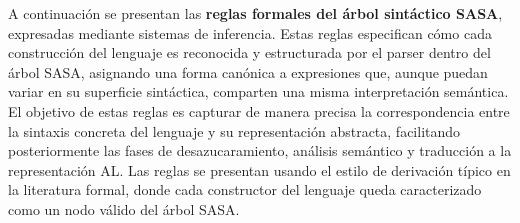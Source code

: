 \documentclass[a4paper,12pt]{article}
\begin{document}
\begin{tcolorbox}[title= Correción: Reglas de Inferencia SASA, breakable]
A continuación se presentan las \textbf{reglas formales del árbol sintáctico SASA}, expresadas mediante sistemas de inferencia. Estas reglas especifican cómo cada construcción del lenguaje es reconocida y estructurada por el parser dentro del árbol SASA, asignando una forma canónica a expresiones que, aunque puedan variar en su superficie sintáctica, comparten una misma interpretación semántica. El objetivo de estas reglas es capturar de manera precisa la correspondencia entre la sintaxis concreta del lenguaje y su representación abstracta, facilitando posteriormente las fases de desazucaramiento, análisis semántico y traducción a la representación AL. Las reglas se presentan usando el estilo de derivación típico en la literatura formal, donde cada constructor del lenguaje queda caracterizado como un nodo válido del árbol SASA.


\begin{prooftree}
\end{prooftree}

\begin{prooftree}
\end{prooftree}

\begin{prooftree}
\end{prooftree}

\begin{prooftree}
\end{prooftree}

\begin{prooftree}
\end{prooftree}

\begin{prooftree}
\end{prooftree}

\begin{prooftree}
\end{prooftree}

\begin{prooftree}
\end{prooftree}


\end{tcolorbox}
\end{document}
